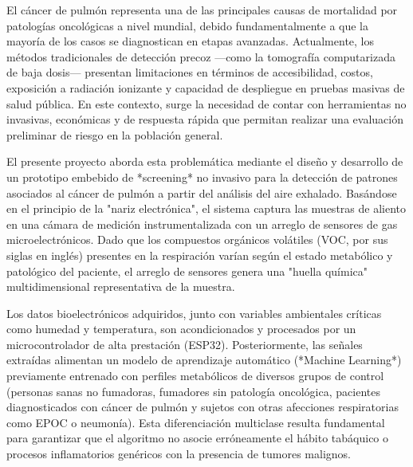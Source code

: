 \documentclass[12pt]{article}
\begin{document}
El cáncer de pulmón representa una de las principales causas de mortalidad por patologías oncológicas a nivel mundial, debido fundamentalmente a que la mayoría de los casos se diagnostican en etapas avanzadas. Actualmente, los métodos tradicionales de detección precoz —como la tomografía computarizada de baja dosis— presentan limitaciones en términos de accesibilidad, costos, exposición a radiación ionizante y capacidad de despliegue en pruebas masivas de salud pública. En este contexto, surge la necesidad de contar con herramientas no invasivas, económicas y de respuesta rápida que permitan realizar una evaluación preliminar de riesgo en la población general.

El presente proyecto aborda esta problemática mediante el diseño y desarrollo de un prototipo embebido de *screening* no invasivo para la detección de patrones asociados al cáncer de pulmón a partir del análisis del aire exhalado. Basándose en el principio de la "nariz electrónica", el sistema captura las muestras de aliento en una cámara de medición instrumentalizada con un arreglo de sensores de gas microelectrónicos. Dado que los compuestos orgánicos volátiles (VOC, por sus siglas en inglés) presentes en la respiración varían según el estado metabólico y patológico del paciente, el arreglo de sensores genera una "huella química" multidimensional representativa de la muestra.

Los datos bioelectrónicos adquiridos, junto con variables ambientales críticas como humedad y temperatura, son acondicionados y procesados por un microcontrolador de alta prestación (ESP32). Posteriormente, las señales extraídas alimentan un modelo de aprendizaje automático (*Machine Learning*) previamente entrenado con perfiles metabólicos de diversos grupos de control (personas sanas no fumadoras, fumadores sin patología oncológica, pacientes diagnosticados con cáncer de pulmón y sujetos con otras afecciones respiratorias como EPOC o neumonía). Esta diferenciación multiclase resulta fundamental para garantizar que el algoritmo no asocie erróneamente el hábito tabáquico o procesos inflamatorios genéricos con la presencia de tumores malignos.
\end{document}
